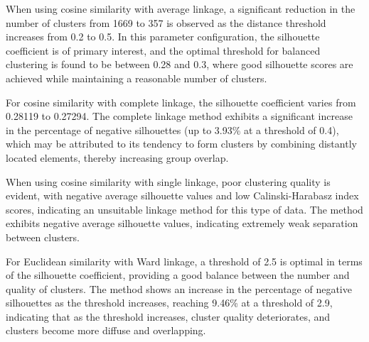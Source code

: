 
When using cosine similarity with average linkage, a significant
reduction in the number of clusters from 1669 to 357 is observed as the
distance threshold increases from 0.2 to 0.5. In this parameter
configuration, the silhouette coefficient is of primary interest, and
the optimal threshold for balanced clustering is found to be between
0.28 and 0.3, where good silhouette scores are achieved while
maintaining a reasonable number of clusters.

For cosine similarity with complete linkage, the silhouette coefficient
varies from 0.28119 to 0.27294. The complete linkage method exhibits a
significant increase in the percentage of negative silhouettes (up to
3.93\% at a threshold of 0.4), which may be attributed to its tendency
to form clusters by combining distantly located elements, thereby
increasing group overlap.

When using cosine similarity with single linkage, poor clustering
quality is evident, with negative average silhouette values and low
Calinski-Harabasz index scores, indicating an unsuitable linkage method
for this type of data. The method exhibits negative average silhouette
values, indicating extremely weak separation between clusters.

For Euclidean similarity with Ward linkage, a threshold of 2.5 is
optimal in terms of the silhouette coefficient, providing a good balance
between the number and quality of clusters. The method shows an increase
in the percentage of negative silhouettes as the threshold increases,
reaching 9.46\% at a threshold of 2.9, indicating that as the threshold
increases, cluster quality deteriorates, and clusters become more
diffuse and overlapping.

